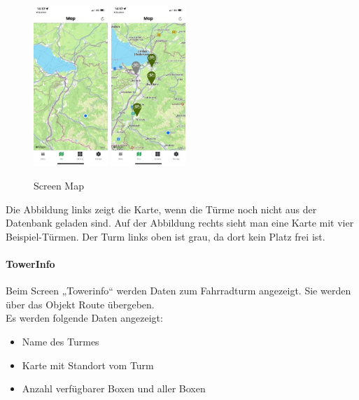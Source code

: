 \begin{figure}[H]
  \centering
  \includegraphics[width=0.25\textwidth]{images/app-screenshots/screenmapa.jpg}
  \includegraphics[width=0.25\textwidth]{images/app-screenshots/screenmapb.jpg}
  \caption{Screen Map}
  \label{fig:screenmap}
\end{figure}

Die Abbildung links zeigt die Karte, wenn die Türme noch nicht aus der Datenbank geladen sind.
Auf der Abbildung rechts sieht man eine Karte mit vier Beispiel-Türmen. Der Turm links oben ist grau, da dort kein Platz frei ist. \\

\paragraph{TowerInfo}Beim Screen „Towerinfo“ werden Daten zum Fahrradturm angezeigt. Sie werden über das Objekt Route übergeben.\\
Es werden folgende Daten angezeigt:
\begin{itemize}
  \item Name des Turmes
  \item Karte mit Standort vom Turm
  \item Anzahl verfügbarer Boxen und aller Boxen
\end{itemize}

